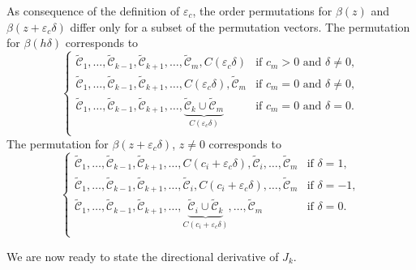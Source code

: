 \begin{remark}
  As consequence of the definition of \(\varepsilon_c\), the order permutations
  for \(\beta(z)\) and \(\beta(z + {\varepsilon_c} \delta)\) differ only for a
  subset of the permutation vectors. The permutation for \(\beta(h\delta)\)
  corresponds to
  \[
    \begin{cases}
      \tilde{\mathcal{C}}_1, \dots, \tilde{\mathcal{C}}_{k-1}, \tilde{\mathcal{C}}_{k+1}, \dots, \tilde{\mathcal{C}}_m, C({\varepsilon_c}\delta)                                          & \text{if } c_m > 0 \text{ and } \delta \neq 0, \\
      \tilde{\mathcal{C}}_1, \dots, \tilde{\mathcal{C}}_{k-1}, \tilde{\mathcal{C}}_{k+1}, \dots, C({\varepsilon_c}\delta), \tilde{\mathcal{C}}_m                                          & \text{if } c_m = 0 \text{ and } \delta \neq 0, \\
      \tilde{\mathcal{C}}_1, \dots, \tilde{\mathcal{C}}_{k-1}, \tilde{\mathcal{C}}_{k+1}, \dots, \underbrace{\tilde{\mathcal{C}}_k \cup \tilde{\mathcal{C}}_m}_{C({\varepsilon_c}\delta)} & \text{if } c_m = 0 \text{ and } \delta = 0.    \\
    \end{cases}
  \]
  The permutation for \(\beta(z + {\varepsilon_c} \delta)\), \(z \neq 0\) corresponds to
  \[
    \begin{cases}
      \tilde{\mathcal{C}}_1, \dots, \tilde{\mathcal{C}}_{k-1}, \tilde{\mathcal{C}}_{k+1}, \dots, C(c_i + {\varepsilon_c}\delta), \tilde{\mathcal{C}}_i, \dots, \tilde{\mathcal{C}}_m                                          & \text{if } \delta = 1,  \\
      \tilde{\mathcal{C}}_1, \dots, \tilde{\mathcal{C}}_{k-1}, \tilde{\mathcal{C}}_{k+1}, \dots, \tilde{\mathcal{C}}_i, C(c_i + {\varepsilon_c}\delta), \dots, \tilde{\mathcal{C}}_m                                          & \text{if } \delta = -1, \\
      \tilde{\mathcal{C}}_1, \dots, \tilde{\mathcal{C}}_{k-1}, \tilde{\mathcal{C}}_{k+1}, \dots, \underbrace{\tilde{\mathcal{C}}_i \cup \tilde{\mathcal{C}}_k}_{C(c_i + {\varepsilon_c}\delta)}, \dots, \tilde{\mathcal{C}}_m & \text{if } \delta = 0.  \\
    \end{cases}
  \]
\end{remark}

We are now ready to state the directional derivative of \(J_k\).

